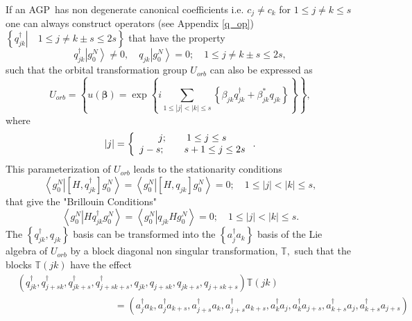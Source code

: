 \documentclass[aps,preprint]{revtex4}%
\begin{document}
If an AGP\ has non degenerate canonical coefficients i.e. $c_{j}\neq c_{k}$
for $1\leq j\neq k\leq s$ one can \cite{weiner2004}\cite{Goscinski80}%
\cite{Kurtz82}\cite{Ohrn82} always construct operators (see Appendix
\ref{q_op}) $\left\{  \left.  q_{jk}^{\dagger}\right\vert \quad1\leq j\neq
k\pm s\leq2s\right\}  $ that have the property
\begin{equation}
q_{jk}^{\dagger}\left\vert g_{0}^{N}\right\rangle \neq0,\quad q_{jk}\left\vert
g_{0}^{N}\right\rangle =0;\quad1\leq j\neq k\pm s\leq2s,
\end{equation}
such that the orbital transformation group $U_{orb}$ can also be expressed as
\begin{equation}
U_{orb}=\left\{  u\left(  \mathbf{\beta}\right)  =\exp\left\{  i\sum
_{1\leq\left\vert j\right\vert <\left\vert k\right\vert \leq s}\left\{
\beta_{jk}q_{jk}^{\dagger}+\beta_{jk}^{\ast}q_{jk}\right\}  \right\}
\right\}  ,
\end{equation}
where
\begin{equation}
\left\vert j\right\vert =\left\{
\begin{array}
[c]{c}%
j;\qquad1\leq j\leq s\\
j-s;\qquad s+1\leq j\leq2s
\end{array}
\right.  .
\end{equation}
This parameterization of $U_{orb}$ leads to the stationarity conditions
\begin{equation}
\left\langle \left.  g_{0}^{N}\right\vert \left[  H,q_{jk}^{\dagger}\right]
g_{0}^{N}\right\rangle =\left\langle \left.  g_{0}^{N}\right\vert \left[
H,q_{jk}\right]  g_{0}^{N}\right\rangle =0;\quad1\leq\left\vert j\right\vert
<\left\vert k\right\vert \leq s,
\end{equation}
that give the "Brillouin Conditions"
\begin{equation}
\left\langle \left.  g_{0}^{N}\right\vert Hq_{jk}^{\dagger}g_{0}%
^{N}\right\rangle =\left\langle \left.  g_{0}^{N}\right\vert q_{jk}Hg_{0}%
^{N}\right\rangle =0;\quad1\leq\left\vert j\right\vert <\left\vert
k\right\vert \leq s. \label{BC}%
\end{equation}
The $\left\{  q_{jk}^{\dagger},q_{jk}\right\}  $ basis can be transformed into
the $\left\{  a_{j}^{\dagger}a_{k}\right\}  $ basis of the Lie algebra of
$U_{orb}$ by a block diagonal non singular transformation, $\mathbb{T},$ such
that the blocks $\mathbb{T}\left(  jk\right)  $ have the effect
\begin{align}
&  \left(  q_{jk}^{\dagger},q_{j+sk}^{\dagger},q_{jk+s}^{\dagger}%
,q_{j+sk+s}^{\dagger},q_{jk},q_{j+sk},q_{jk+s},q_{j+sk+s}\right)
\mathbb{T}\left(  jk\right) \nonumber\\
&  \qquad\qquad\qquad\qquad\qquad\left.  =\right.  \left(  a_{j}^{\dagger
}a_{k},a_{j}^{\dagger}a_{k+s},a_{j+s}^{\dagger}a_{k},a_{j+s}^{\dagger}%
a_{k+s},a_{k}^{\dagger}a_{j},a_{k}^{\dagger}a_{j+s},a_{k+s}^{\dagger}%
a_{j},a_{k+s}^{\dagger}a_{j+s}\right)
\end{align}
\end{document}
